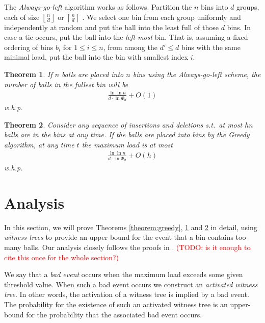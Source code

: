 \documentclass[a4paper,12pt]{article}
\newcommand\todo[1]{\textcolor{red}{(TODO: #1)}}
\newtheorem{theorem}{Theorem}
\begin{document}
The \emph{Always-go-left} algorithm works as follows. Partition the $n$ bins into $d$ groups, each of size $\left\lfloor \frac{n}{d}\right\rfloor$ or $\left\lceil\frac{n}{d}\right\rceil$ . We select one bin from each group uniformly and independently at random and put the ball into the least full of those $d$ bins. In case a tie occurs, put the ball into the \emph{left-most} bin. That is, assuming a fixed ordering of bins $b_i$ for $1 \leq i \leq n$, from among the $d' \leq d$ bins with the same minimal load, put the ball into the bin with smallest index $i$.

\begin{theorem}
\label{theorem:agln}
If $n$ balls are placed into $n$ bins using the Always-go-left scheme, the number of balls in the fullest bin will be 
\begin{align*}
\frac{\ln\ln n}{d \cdot \ln \Phi_d} + O(1)
\end{align*}
w.h.p.
\end{theorem}

\begin{theorem}
\label{theorem:algm}
Consider any sequence of insertions and deletions s.t.~at most $hn$ balls are in the bins at any time. If the balls are placed into bins by the Greedy algorithm, at any time $t$ the maximum load is at most 
\begin{align*}
\frac{\ln\ln n}{d \cdot \ln \Phi_d} + O(h)
\end{align*}
w.h.p.
\end{theorem}

\section{Analysis}
\label{sec:analysis}
In this section, we will prove Theorems \ref{theorem:greedy}, \ref{theorem:agln} and \ref{theorem:algm} in detail, using \emph{witness trees} to provide an upper bound for the event that a bin contains too many balls. Our analysis closely follows the proofs in \cite{VOC03}. \todo{is it enough to cite this once for the whole section?}

We say that a \emph{bad event} occurs when the maximum load exceeds some given threshold value. When such a bad event occurs we construct an \emph{activated witness tree}. In other words, the activation of a witness tree is implied by a bad event. The probability for the existence of such an activated witness tree is an upper-bound for the probability that the associated bad event occurs.
\end{document}
